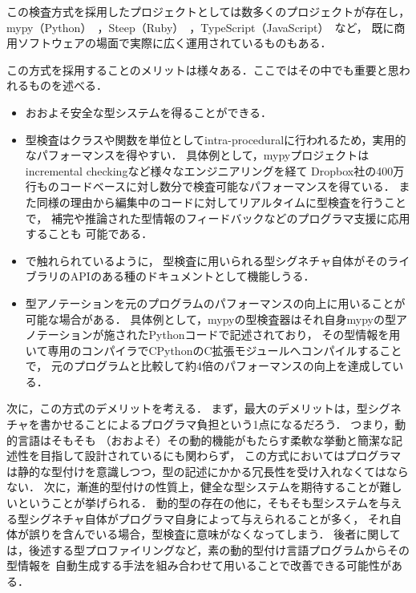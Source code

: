 この検査方式を採用したプロジェクトとしては数多くのプロジェクトが存在し，
mypy（Python）~\cite{mypy}，Steep（Ruby）~\cite{steep}，TypeScript（JavaScript）~\cite{typescript}など，
既に商用ソフトウェアの場面で実際に広く運用されているものもある．\

この方式を採用することのメリットは様々ある．ここではその中でも重要と思われるものを述べる．
\begin{itemize}
  \item おおよそ安全な型システムを得ることができる．
  \item 型検査はクラスや関数を単位としてintra-proceduralに行われるため，実用的なパフォーマンスを得やすい．
        具体例として，mypyプロジェクトはincremental checkingなど様々なエンジニアリングを経て
        Dropbox社の400万行ものコードベースに対し数分で検査可能なパフォーマンスを得ている\cite{dropbox}．
        また同様の理由から編集中のコードに対してリアルタイムに型検査を行うことで，
        補完や推論された型情報のフィードバックなどのプログラマ支援に応用することも
        可能である\cite{flow, typescript}．
  \item \cite{ruby-progress-report}で触れられているように，
        型検査に用いられる型シグネチャ自体がそのライブラリのAPIのある種のドキュメントとして機能しうる．
  \item 型アノテーションを元のプログラムのパフォーマンスの向上に用いることが可能な場合がある．
        具体例として，mypyの型検査器はそれ自身mypyの型アノテーションが施されたPythonコードで記述されており，
        その型情報を用いて専用のコンパイラでCPythonのC拡張モジュールへコンパイルすることで，
        元のプログラムと比較して約4倍のパフォーマンスの向上を達成している\cite{dropbox}．
\end{itemize}

次に，この方式のデメリットを考える．
まず，最大のデメリットは，型シグネチャを書かせることによるプログラマ負担という1点になるだろう．
つまり，動的言語はそもそも
（おおよそ）その動的機能がもたらす柔軟な挙動と簡潔な記述性を目指して設計されているにも関わらず，
この方式においてはプログラマは静的な型付けを意識しつつ，型の記述にかかる冗長性を受け入れなくてはならない．
次に，漸進的型付けの性質上，健全な型システムを期待することが難しいということが挙げられる．
動的型の存在の他に，そもそも型システムを与える型シグネチャ自体がプログラマ自身によって与えられることが多く，
それ自体が誤りを含んでいる場合，型検査に意味がなくなってしまう．
後者に関しては，後述する型プロファイリングなど，素の動的型付け言語プログラムからその型情報を
自動生成する手法を組み合わせて用いることで改善できる可能性がある\footnotemark．

